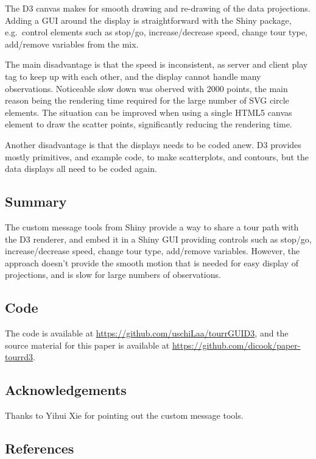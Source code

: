 The D3 canvas makes for smooth drawing and re-drawing of the data
projections. Adding a GUI around the display is straightforward with the
Shiny package, e.g.~control elements such as stop/go, increase/decrease
speed, change tour type, add/remove variables from the mix.

The main disadvantage is that the speed is inconsistent, as server and
client play tag to keep up with each other, and the display cannot
handle many observations. Noticeable slow down was oberved with 2000
points, the main reason being the rendering time required for the large
number of SVG circle elements. The situation can be improved when using
a single HTML5 canvas element to draw the scatter points, significantly
reducing the rendering time.

Another disadvantage is that the displays needs to be coded anew. D3
provides mostly primitives, and example code, to make scatterplots, and
contours, but the data displays all need to be coded again.

\hypertarget{summary}{%
\subsection{Summary}\label{summary}}

The custom message tools from Shiny provide a way to share a tour path
with the D3 renderer, and embed it in a Shiny GUI providing controls
such as stop/go, increase/decrease speed, change tour type, add/remove
variables. However, the approach doesn't provide the smooth motion that
is needed for easy display of projections, and is slow for large numbers
of observations.

\hypertarget{code}{%
\subsection{Code}\label{code}}

The code is available at \url{https://github.com/uschiLaa/tourrGUID3},
and the source material for this paper is available at
\url{https://github.com/dicook/paper-tourrd3}.

\hypertarget{acknowledgements}{%
\subsection{Acknowledgements}\label{acknowledgements}}

Thanks to Yihui Xie for pointing out the custom message tools.

\hypertarget{references}{%
\subsection{References}\label{references}}

